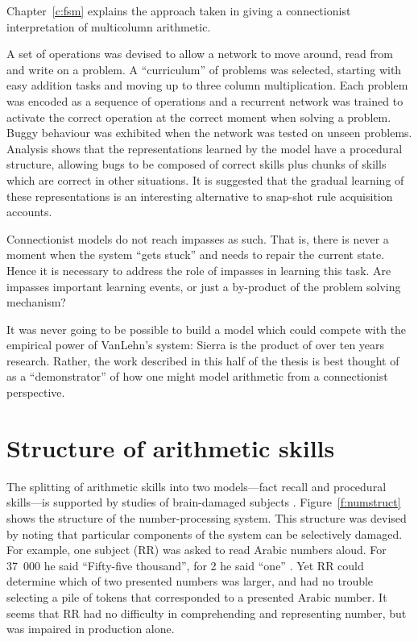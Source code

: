 Chapter~\ref{c:fsm} explains the approach taken in giving a
connectionist interpretation of multicolumn arithmetic.

A set of operations was devised to allow a network to move around, read
from and write on a problem.  A ``curriculum'' of problems was selected,
starting with easy addition tasks and moving up to three column
multiplication.  Each problem was encoded as a sequence of operations and a
recurrent network was trained to activate the correct operation at the
correct moment when solving a problem.  Buggy behaviour was exhibited when
the network was tested on unseen problems.  Analysis shows that the
representations learned by the model have a procedural structure, allowing
bugs to be composed of correct skills plus chunks of skills which are
correct in other situations.  It is suggested that the gradual learning of
these representations is an interesting alternative to snap-shot rule
acquisition accounts.

Connectionist models do not reach impasses as such.  That is, there is
never a moment when the system ``gets stuck'' and needs to repair the
current state.  Hence it is necessary to address the role of impasses in
learning this task. Are impasses important learning events, or just a
by-product of the problem solving mechanism?

It was never going to be possible to build a model which could compete with
the empirical power of VanLehn's system: Sierra is the product of
over ten years research.  Rather, the work described in this half of the
thesis is best thought of as a ``demonstrator'' of how one might model
arithmetic from a connectionist perspective.

\section{Structure of arithmetic skills}

The splitting of arithmetic skills into two models---fact recall and
procedural skills---is supported by studies of brain-damaged subjects
\cite{mcclcogn,mcclfact}. Figure~\ref{f:numstruct} shows the structure of
the number-processing system.  This structure was devised by noting that
particular components of the system can be selectively damaged. For
example, one subject (RR) was asked to read Arabic numbers aloud. For
37~000 he said ``Fifty-five thousand'', for 2 he said ``one''
\cite[pp.~187--188]{mcclcogn}. Yet RR could determine which of two
presented numbers was larger, and had no trouble selecting a pile of tokens
that corresponded to a presented Arabic number.  It seems that RR had no
difficulty in comprehending and representing number, but was impaired in
production alone.

